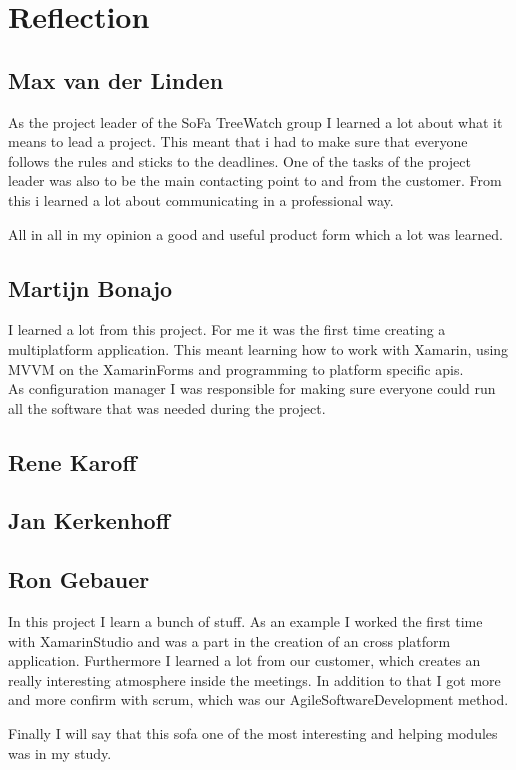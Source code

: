 \section{Reflection}
\subsection{Max van der Linden}
As the project leader of the SoFa TreeWatch group I learned a lot about what it means to lead a project. This meant that i had to make sure that everyone follows the rules and sticks to the deadlines. One of the tasks of the project leader was also to be the main contacting point to and from the customer. From this i learned a lot about communicating in a professional way.

All in all in my opinion a good and useful product form which a lot was learned.

\subsection{Martijn Bonajo}

I learned a lot from this project. For me it was the first time creating a multiplatform application. This meant learning how to work with Xamarin, using MVVM on the \gls{XamarinForms} and programming to platform specific \gls{api}s.\\
As configuration manager I was responsible for making sure everyone could run all the software that was needed during the project.

\subsection{Rene Karoff}


\subsection{Jan Kerkenhoff}


\subsection{Ron Gebauer}
In this project I learn a bunch of stuff. As an example I worked the first time with \gls{XamarinStudio} and was a part in the creation of an cross platform application. Furthermore I learned a lot from our customer, which creates an really interesting atmosphere inside the meetings. In addition to that I got more and more confirm with \gls{scrum}, which was our \gls{AgileSoftwareDevelopment} method.

Finally I will say that this \gls{sofa} one of the most interesting and helping modules was in my study.